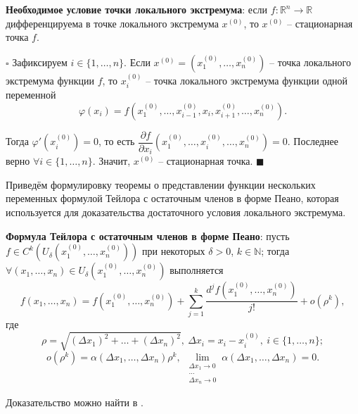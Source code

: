 \documentclass[12pt, a4paper, reqno]{article}
\begin{document}
    \textbf{Необходимое условие точки локального экстремума}: если $f: \mathbb{R}^n \to \mathbb{R}$
    дифференцируема в точке локального экстремума $x^{(0)}$, то $x^{(0)}$ -- стационарная точка $f$.

    $\square$
    Зафиксируем $i \in \{1, \ldots, n\}$. Если $x^{(0)} = (x_1^{(0)}, \ldots, x_n^{(0)})$ -- точка
    локального экстремума функции $f$, то $x_i^{(0)}$ -- точка локального экстремума функции
    одной переменной
    \begin{equation*}
        \varphi(x_i) = f(x_1^{(0)}, \ldots, x_{i - 1}^{(0)}, x_i, x_{i + 1}^{(0)}, \ldots, x_n^{(0)}).
    \end{equation*}

    Тогда $\varphi'(x_i^{(0)}) = 0$, то есть
    $\dfrac{\partial f}{\partial x_i}(x_1^{(0)}, \ldots, x_i^{(0)}, \ldots, x_n^{(0)}) = 0$.
    Последнее верно $\forall i \in \{1, \ldots, n\}$. Значит, $x^{(0)}$ -- стационарная точка.
    $\blacksquare$

    Приведём формулировку теоремы о представлении функции нескольких переменных формулой Тейлора
    с остаточным членов в форме Пеано, которая используется для доказательства достаточного
    условия локального экстремума.

    \textbf{Формула Тейлора с остаточным членов в форме Пеано}: пусть
    $f \in C^k(U_{\delta}(x_1^{(0)}, \ldots, x_n^{(0)}))$ при некоторых $\delta > 0$, $k \in \mathbb{N}$;
    тогда $\forall (x_1, \ldots, x_n) \in U_{\delta}(x_1^{(0)}, \ldots, x_n^{(0)})$ выполняется
    \begin{equation*}
        f(x_1, \ldots, x_n) = f(x_1^{(0)}, \ldots, x_n^{(0)}) +
        \sum\limits_{j = 1}^{k}\frac{d^j f(x_1^{(0)}, \ldots, x_n^{(0)})}{j!} + o(\rho^k),
    \end{equation*}
    где
    \begin{equation*}
        \rho = \sqrt{(\Delta x_1)^2 + \ldots + (\Delta x_n)^2},\ \Delta x_i = x_i - x_i^{(0)},\
        i \in \{1, \ldots, n\};
    \end{equation*}
    \begin{equation*}
        o(\rho^k) = \alpha(\Delta x_1, \ldots, \Delta x_n) \rho^k,\
        \lim\limits_{\substack{\Delta x_1 \to 0 \\ \ldots \\ \Delta x_n \to 0}}
            \alpha(\Delta x_1, \ldots, \Delta x_n) = 0.
    \end{equation*}

    Доказательство можно найти в \cite{petrovich-2}.
\end{document}
